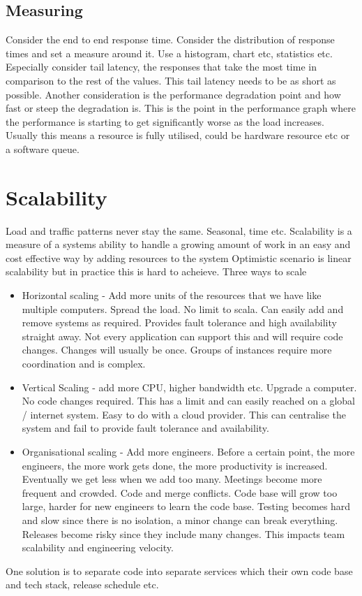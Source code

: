 \documentclass[a4paper, 11pt]{book}
\begin{document}
    \subsection{Measuring}
    Consider the end to end response time.
    Consider the distribution of response times and set a measure around it.
    Use a histogram, chart etc, statistics etc.
    Especially consider tail latency, the responses that take the most time in comparison to the rest of the values.
    This tail latency needs to be as short as possible.
    Another consideration is the performance degradation point and how fast or steep the degradation is.
    This is the point in the performance graph where the performance is starting to get significantly worse as the load increases.
    Usually this means a resource is fully utilised, could be hardware resource etc or a software queue.

    \section{Scalability}
    Load and traffic patterns never stay the same.
    Seasonal, time etc.
    Scalability is a measure of a systems ability to handle a growing amount of work in an easy and cost effective way by adding resources to the system
    Optimistic scenario is linear scalability but in practice this is hard to acheieve.
    Three ways to scale
    \begin{itemize}
        \item Horizontal scaling - Add more units of the resources that we have like multiple computers.
        Spread the load.
        No limit to scala.
        Can easily add and remove systems as required.
        Provides fault tolerance and high availability straight away.
        Not every application can support this and will require code changes.
        Changes will usually be once.
        Groups of instances require more coordination and is complex.
        \item Vertical Scaling - add more CPU, higher bandwidth etc.
        Upgrade a computer.
        No code changes required.
        This has a limit and can easily reached on a global / internet system.
        Easy to do with a cloud provider.
        This can centralise the system and fail to provide fault tolerance and availability.
        \item Organisational scaling - Add more engineers.
        Before a certain point, the more engineers, the more work gets done, the more productivity is increased.
        Eventually we get less when we add too many.
        Meetings become more frequent and crowded.
        Code and merge conflicts.
        Code base will grow too large, harder for new engineers to learn the code base.
        Testing becomes hard and slow since there is no isolation, a minor change can break everything.
        Releases become risky since they include many changes.
        This impacts team scalability and engineering velocity.
    \end{itemize}
    One solution is to separate code into separate services which their own code base and tech stack, release schedule etc.
\end{document}

